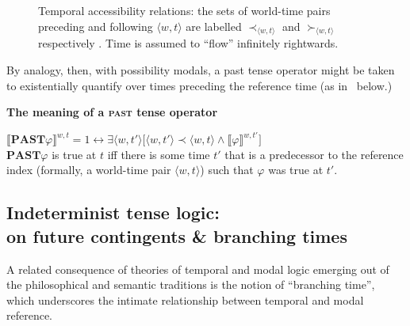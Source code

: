 \documentclass[11pt,dvipsnames]{report}
\providecommand{\denote}[2][]{\ensuremath{\llbracket{#2}\rrbracket^{#1}}}
\begin{document}
\begin{figure}[h]\centering
	\caption[Temporal accessibility relations]{Temporal accessibility relations: the sets of world-time pairs preceding and following $ \langle w,t\rangle $  are labelled $ \prec_{\langle w,t\rangle} $ and  $ \succ_{\langle w,t\rangle} $ respectively \citep*[adapted from][93]{Kaufmann2006}. Time is assumed to ``flow'' infinitely rightwards.}\label{temp-access}
\end{figure}

By analogy, then, with possibility modals, a past tense operator might be taken to existentially quantify over times preceding the reference time (as in \nextx~below.)

\pex\textbf{The meaning of a \textsc{past} tense operator}

 $ \denote[w,t]{\mathbf{PAST}\varphi}=1\leftrightarrow\exists \langle{w,t'}\rangle\big[\langle{w,t'}\rangle\prec \langle{w,t}\rangle\wedge \denote[w,t']{\varphi}\big]$\\
$ \mathbf{PAST}\varphi $ is true at $ t $ iff there is some time $ t' $ that is a predecessor to the reference index (formally, a world-time pair $ \langle w,t\rangle $) such that $ \varphi $ was true at $ t' $.\xe


\subsection[Indeterminist tense logic]{Indeterminist tense logic:\\on future contingents \& branching times}\label{BT-review} A related consequence of theories of temporal and modal logic emerging out of the philosophical and semantic traditions is the notion of ``branching time'', which underscores the intimate relationship between temporal and modal reference.  %
\end{document}
